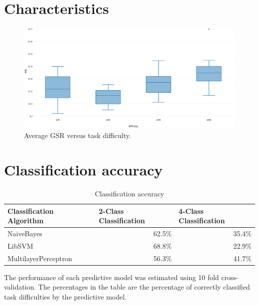 \documentclass[11pt,leqno,a4paper]{report} %
\begin{document}
\pagebreak

\section{Characteristics}

\begin{figure}[H]
  \centering
 	\hspace*{-.25\textwidth}   
 	\includegraphics[width=1.5\textwidth]{avggsr.eps}
  \caption{Average GSR versus task difficulty.}
\end{figure}



\section{Classification accuracy}
\begin{table}[h]
\caption {Classification accuracy} 
\center
\begin{tabular}{@{}lrr@{}}
\toprule
Classification Algorithm & \multicolumn{1}{l}{2-Class Classification} & \multicolumn{1}{l}{4-Class Classification} \\ \midrule
NaiveBayes               & 62.5\%                                     & 35.4\%                                     \\
LibSVM                   & 68.8\%                                     & 22.9\%                                     \\
MultilayerPerceptron     & 56.3\%                                     & 41.7\%                                     \\ \bottomrule
\end{tabular}
\end{table}

The performance of each predictive model was estimated using 10 fold cross-validation. The percentages in the table are the percentage of correctly classified task difficulties by the predictive model.
\end{document}
